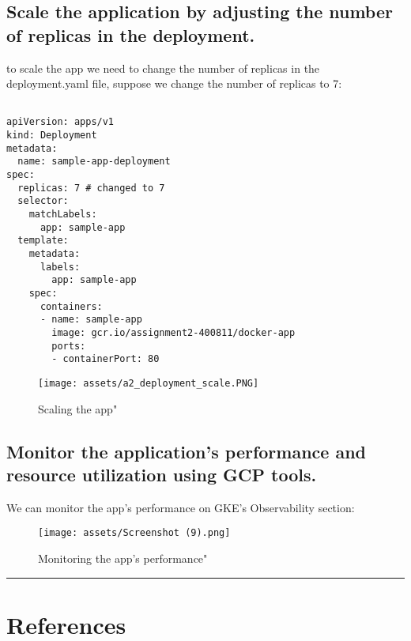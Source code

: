 \documentclass[12pt]{article}
\begin{document}
\subsection{Scale the application by adjusting the number of replicas in the deployment.}

to scale the app we need to change the number of replicas in the deployment.yaml file, suppose we change the number of replicas to 7:

\begin{listing}[H]
\begin{verbatim}

apiVersion: apps/v1
kind: Deployment
metadata:
  name: sample-app-deployment
spec:
  replicas: 7 # changed to 7
  selector:
    matchLabels:
      app: sample-app
  template:
    metadata:
      labels:
        app: sample-app
    spec:
      containers:
      - name: sample-app
        image: gcr.io/assignment2-400811/docker-app  
        ports:
        - containerPort: 80

\end{verbatim}
\end{listing}

\begin{figure}[H]
    \centering
    \texttt{[image: assets/a2\_deployment\_scale.PNG]}
    \caption{Scaling the app"}
    \label{fig:logo}
\end{figure}

\subsection{Monitor the
application's performance and resource utilization using GCP tools.}

We can monitor the app's performance on GKE's Observability section:

\begin{figure}[H]
    \centering
    \texttt{[image: assets/Screenshot (9).png]}
    \caption{Monitoring the app's performance"}
    \label{fig:logo}
\end{figure}

\rule{\linewidth}{1pt}


\clearpage

\section{References}
\end{document}
